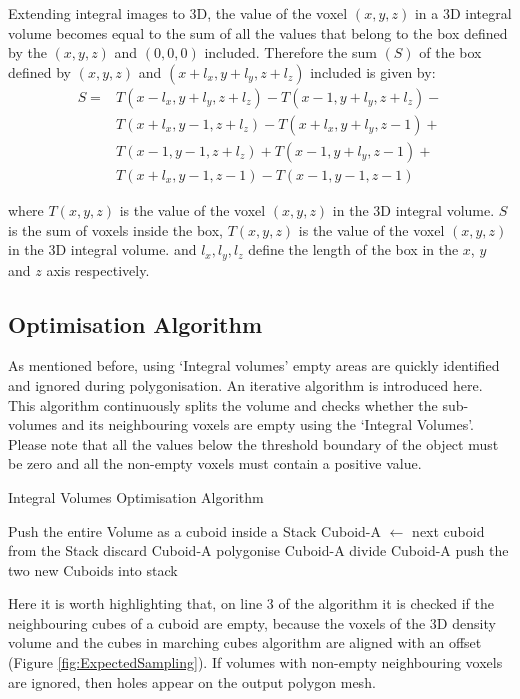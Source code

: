 \documentclass{subfiles}
\begin{document}
Extending integral images to 3D, the value of the voxel $(x ,y, z)$ in a 3D integral volume becomes equal to the sum of all the values that belong to the box defined by the $(x, y, z)$ and $(0, 0, 0)$ included. 
Therefore the sum $(S)$ of the box defined by $(x, y, z)$ and $(x+l_x, y+l_y, z+l_z)$ included is given by:
\begin{equation}
\begin{split}
S = & T(x-l_x,y+l_y,z+l_z) - 
T(x-1,y+l_y,z+l_z) - \\
&  T(x+l_x,y-1,z+l_z) - 	
T(x+l_x,y+l_y,z-1) + \\
&  T(x-1,y-1,z+l_z)   +
T(x-1,y+l_y,z-1)   +  \\
&  T(x+l_x,y-1,z-1)   -
T(x-1,y-1,z-1)
\end{split}
\end{equation}

where 	$T(x, y, z)$ is the value of the voxel $(x, y, z)$ in the 3D integral volume.  
$S$ is the sum of voxels inside the box, $T(x, y, z)$ is the value of the voxel $(x, y, z)$ in the 3D integral volume. and $l_x, l_y, l_z$ define the length of the box in the $x$, $y$ and $z$ axis respectively. 



\subsection{Optimisation Algorithm}\label{sec:IVoptApproach}
As mentioned before, using `Integral volumes' empty areas are quickly identified and ignored during polygonisation. An iterative algorithm is introduced here. This algorithm continuously splits the volume and checks whether the sub-volumes and its neighbouring voxels are empty using the `Integral Volumes'. Please note that all the values below the threshold boundary of the object must be zero and all the non-empty voxels must contain a positive value.  

\begin{algorithm}
	\caption{Integral Volumes Optimisation Algorithm}
	\label{alg:IVoptSimple}
	\centering
	\begin{algorithmic}[1]
		\State Push the entire Volume as a cuboid inside a Stack
		\State Cuboid-A   $\gets$  next cuboid from the Stack 
		\State	discard Cuboid-A
		\State polygonise Cuboid-A
		\Else 
		\State divide Cuboid-A
		\State push the two new Cuboids into stack
		\EndIf
		\EndWhile
	\end{algorithmic}
\end{algorithm}
Here it is worth highlighting that, on line 3 of the algorithm it is checked if the neighbouring cubes of a cuboid are empty, because the voxels of the 3D density volume and the cubes in marching cubes algorithm are  aligned with an offset (Figure \ref{fig:ExpectedSampling}). If volumes with non-empty neighbouring voxels are ignored, then holes appear on the output polygon mesh. 		
\end{document}
